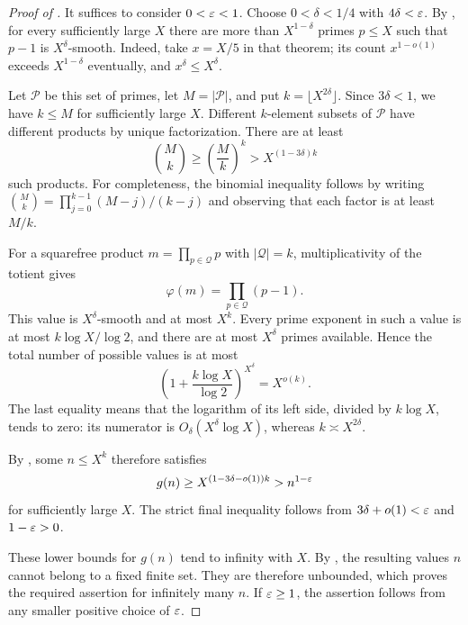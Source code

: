 \begin{proof}[Proof of ]
It suffices to consider $0<\varepsilon<1$. Choose $0<\delta<1/4$ with
$4\delta<\varepsilon$. By , for every sufficiently large
$X$ there are more than $X^{1-\delta}$ primes $p\le X$ such that
$p-1$ is $X^\delta$-smooth. Indeed, take $x=X/5$ in that theorem;
its count $x^{1-o(1)}$ exceeds $X^{1-\delta}$ eventually, and
$x^\delta\le X^\delta$.

Let $\mathcal P$ be this set of primes, let $M=|\mathcal P|$, and
put $k=\lfloor X^{2\delta}\rfloor$. Since $3\delta<1$, we have
$k\le M$ for sufficiently large $X$. Different $k$-element subsets
of $\mathcal P$ have different products by unique factorization.
There are at least
\begin{equation}\label{eq:many-prime-products}
 \binom Mk\ge\left(\frac Mk\right)^k
 >X^{(1-3\delta)k}
\end{equation}
such products. For completeness, the binomial inequality follows
by writing $\binom Mk=\prod_{j=0}^{k-1}(M-j)/(k-j)$ and observing
that each factor is at least $M/k$.

For a squarefree product $m=\prod_{p\in\mathcal Q}p$ with
$|\mathcal Q|=k$, multiplicativity of the totient gives
\[
 \varphi(m)=\prod_{p\in\mathcal Q}(p-1).
\]
This value is $X^\delta$-smooth and at most $X^k$. Every prime
exponent in such a value is at most $k\log X/\log2$, and there
are at most $X^\delta$ primes available. Hence the total number
of possible values is at most
\begin{equation}\label{eq:few-totient-values}
 \left(1+\frac{k\log X}{\log2}\right)^{X^\delta}
 =X^{o(k)}.
\end{equation}
The last equality means that the logarithm of its left side,
divided by $k\log X$, tends to zero: its numerator is
$O_\delta(X^\delta\log X)$, whereas $k\asymp X^{2\delta}$.

By , some
$n\le X^k$ therefore satisfies
\[
 g(n)\ge X^{(1-3\delta-o(1))k}>n^{1-\varepsilon}
\]
for sufficiently large $X$. The strict final inequality follows
from $3\delta+o(1)<\varepsilon$ and $1-\varepsilon>0$.

These lower bounds for $g(n)$ tend to infinity with $X$.
By , the resulting values $n$ cannot
belong to a fixed finite set. They are therefore unbounded, which
proves the required assertion for infinitely many $n$. If
$\varepsilon\ge1$, the assertion follows from any smaller positive
choice of $\varepsilon$.
\end{proof}
